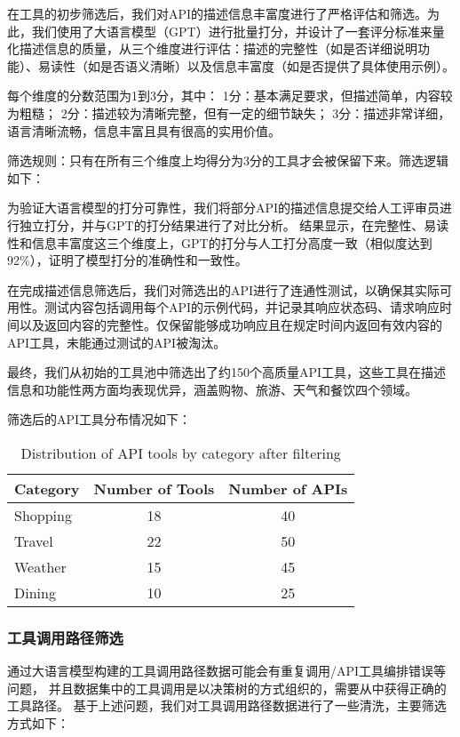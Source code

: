 在工具的初步筛选后，我们对API的描述信息丰富度进行了严格评估和筛选。为此，我们使用了大语言模型（GPT）进行批量打分，并设计了一套评分标准来量化描述信息的质量，从三个维度进行评估：描述的完整性（如是否详细说明功能）、易读性（如是否语义清晰）以及信息丰富度（如是否提供了具体使用示例）。

每个维度的分数范围为1到3分，其中：
1分：基本满足要求，但描述简单，内容较为粗糙；
2分：描述较为清晰完整，但有一定的细节缺失；
3分：描述非常详细，语言清晰流畅，信息丰富且具有很高的实用价值。

筛选规则：只有在所有三个维度上均得分为3分的工具才会被保留下来。筛选逻辑如下：

为验证大语言模型的打分可靠性，我们将部分API的描述信息提交给人工评审员进行独立打分，并与GPT的打分结果进行了对比分析。
结果显示，在完整性、易读性和信息丰富度这三个维度上，GPT的打分与人工打分高度一致（相似度达到92\%），证明了模型打分的准确性和一致性。

在完成描述信息筛选后，我们对筛选出的API进行了连通性测试，以确保其实际可用性。测试内容包括调用每个API的示例代码，并记录其响应状态码、请求响应时间以及返回内容的完整性。仅保留能够成功响应且在规定时间内返回有效内容的API工具，未能通过测试的API被淘汰。

最终，我们从初始的工具池中筛选出了约150个高质量API工具，这些工具在描述信息和功能性两方面均表现优异，涵盖购物、旅游、天气和餐饮四个领域。

筛选后的API工具分布情况如下：

\begin{table}[h]
  \centering
  \caption{Distribution of API tools by category after filtering}
  \label{tab:api_distribution}
  \begin{tabular}{l|c|c}
  \toprule
  \textbf{Category} & \textbf{Number of Tools} & \textbf{Number of APIs} \\ \midrule
  Shopping & 18 & 40 \\ \hline
  Travel   & 22 & 50 \\ \hline
  Weather  & 15 & 45 \\ \hline
  Dining   & 10 & 25 \\ 
  \bottomrule
  \end{tabular}
  \end{table}

\subsubsection{工具调用路径筛选}

通过大语言模型构建的工具调用路径数据可能会有重复调用/API工具编排错误等问题，
并且数据集中的工具调用是以决策树的方式组织的，需要从中获得正确的工具路径。
基于上述问题，我们对工具调用路径数据进行了一些清洗，主要筛选方式如下：

